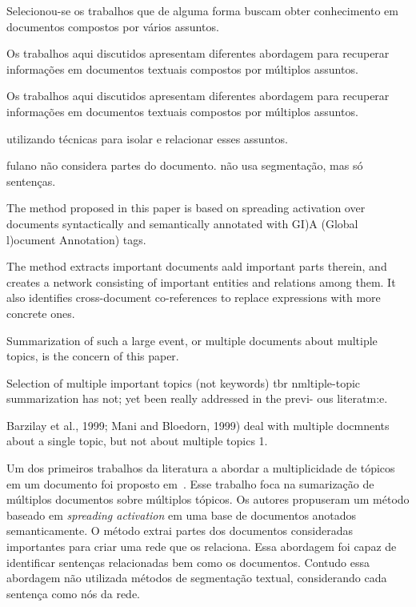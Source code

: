 




Selecionou-se os trabalhos que de alguma forma buscam obter conhecimento em documentos compostos por vários assuntos.  

Os trabalhos aqui discutidos apresentam diferentes abordagem para recuperar informações em   documentos textuais compostos por múltiplos assuntos.  

Os trabalhos aqui discutidos apresentam diferentes abordagem para recuperar informações em documentos textuais compostos por múltiplos assuntos.




utilizando técnicas para isolar e relacionar esses assuntos.




fulano não considera partes do documento. 
não usa segmentação, mas só sentenças.



The method proposed in this paper is
based on spreading activation over documents
syntactically and semantically annotated with
GI)A (Global l)ocument Annotation) tags.
 
The method extracts important documents aald 
important parts therein, and creates a network
consisting of important entities and relations
among them. It also identifies cross-document
co-references to replace expressions with more
concrete ones.



Summarization of such a large event, or multiple 
documents about multiple topics, is the
concern of this paper.


Selection of multiple important topics (not
keywords) tbr nmltiple-topic summarization has
not; yet been really addressed in the previ-
ous literatm:e.

 
Barzilay et al., 1999; Mani and Bloedorn, 1999) deal with multiple docmnents about a single topic, but not about multiple topics 1.  




Um dos primeiros trabalhos da literatura a abordar a multiplicidade de tópicos em um documento foi proposto em~\cite{}. Esse trabalho foca na sumarização de múltiplos documentos sobre múltiplos tópicos. Os autores propuseram um método baseado em \textit{spreading activation} em uma base de documentos anotados semanticamente. O método extrai partes dos documentos consideradas importantes para criar uma rede que os relaciona. Essa abordagem foi capaz de identificar sentenças relacionadas bem como os documentos. Contudo essa abordagem não utilizada métodos de segmentação textual, considerando cada sentença como nós da rede. 

